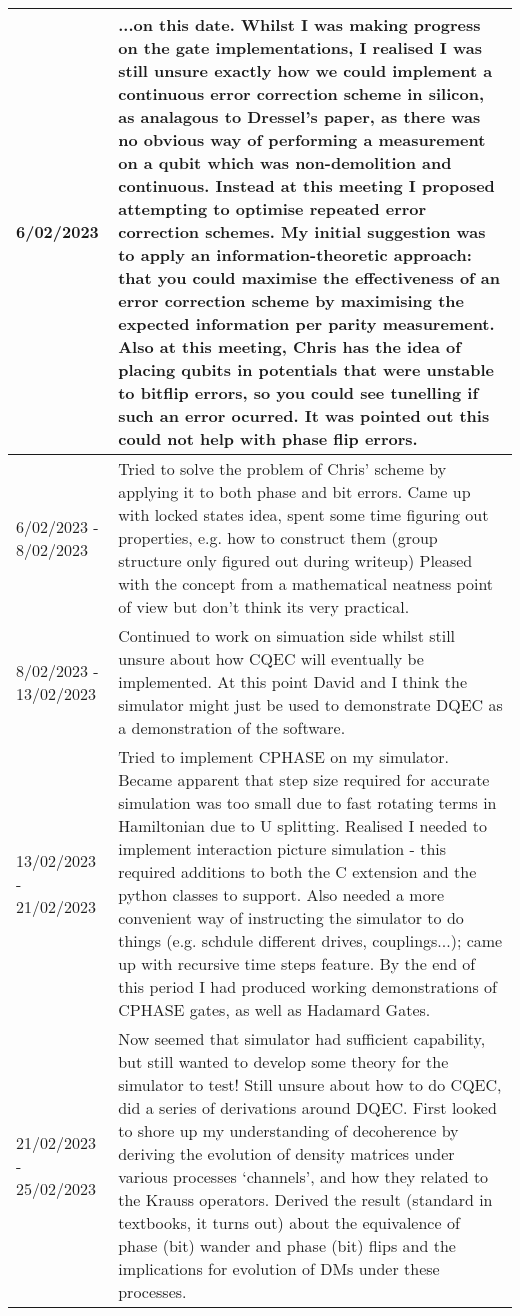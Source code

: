 \documentclass{article}
\begin{document}
\begin{table}
\centering
\begin{tabular}{|p{2cm}|p{10cm}|}
    \hline 6/02/2023&...on this date. Whilst I was making progress on the gate implementations, I realised I was still unsure exactly how we could implement a continuous error correction scheme in silicon, as analagous to Dressel's paper, as there was no obvious way of performing a measurement on a qubit which was non-demolition and continuous. Instead at this meeting I proposed attempting to optimise repeated error correction schemes. My initial suggestion was to apply an information-theoretic approach: that you could maximise the effectiveness of an error correction scheme by maximising the expected information per parity measurement. Also at this meeting, Chris has the idea of placing qubits in potentials that were unstable to bitflip errors, so you could see tunelling if such an error ocurred. It was pointed out this could not help with phase flip errors.\\
    \hline 6/02/2023 - 8/02/2023& Tried to solve the problem of Chris' scheme by applying it to both phase and bit errors. Came up with locked states idea, spent some time figuring out properties, e.g. how to construct them (group structure only figured out during writeup) Pleased with the concept from a mathematical neatness point of view but don't think its very practical. \\
    \hline 8/02/2023 - 13/02/2023 & Continued to work on simuation side whilst still unsure about how CQEC will eventually be implemented. At this point David and I think the simulator might just be used to demonstrate DQEC as a demonstration of the software. \\
    \hline 13/02/2023 - 21/02/2023& Tried to implement CPHASE on my simulator. Became apparent that step size required for accurate simulation was too small due to fast rotating terms in Hamiltonian due to U splitting. Realised I needed to implement interaction picture simulation - this required additions to both the C extension and the python classes to support. Also needed a more convenient way of instructing the simulator to do things (e.g. schdule different drives, couplings...); came up with recursive time steps feature. By the end of this period I had produced working demonstrations of CPHASE gates, as well as Hadamard Gates.\\
    \hline 21/02/2023 - 25/02/2023&Now seemed that simulator had sufficient capability, but still wanted to develop some theory for the simulator to test! Still unsure about how to do CQEC, did a series of derivations around DQEC. First looked to shore up my understanding of decoherence by deriving the evolution of density matrices under various processes `channels', and how they related to the Krauss operators. Derived the result (standard in textbooks, it turns out) about the equivalence of phase (bit) wander and phase (bit) flips and the implications for evolution of DMs under these processes.\\

\end{tabular}
\end{table}
\end{document}
